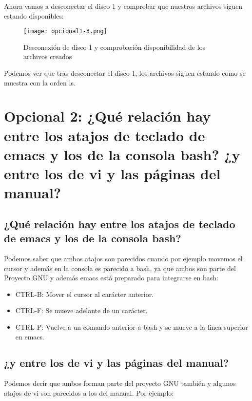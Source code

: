 	Ahora vamos a desconectar el disco 1 y comprobar que nuestros archivos siguen estando disponibles:
	
	\begin{figure}[H]
		\centering
		\texttt{[image: opcional1-3.png]}  
		\label{figura28}
		
		\caption{Desconexión de disco 1 y comprobación disponibilidad de los archivos creados} 
	\end{figure}
	
	Podemos ver que tras desconectar el disco 1, los archivos siguen estando como se muestra con la orden ls.
	\section{Opcional 2: ¿Qué relación hay entre los atajos de teclado de emacs y los de la consola bash? ¿y entre los de vi y las páginas del manual?}
	
	\subsection{¿Qué relación hay entre los atajos de teclado de emacs y los de la consola bash?}
	
	Podemos saber que ambos atajos son parecidos cuando por ejemplo movemos el cursor y además en la consola es parecido a bash, ya que ambos son parte del Proyecto GNU y además emacs está preparado para integrarse en bash\cite{cincuentaynueve,sesenta}:
	
	\begin{itemize}
		\item CTRL-B: Mover el cursor al carácter anterior.
		\item CTRL-F: Se mueve adelante de un carácter.
		\item CTRL-P: Vuelve a un comando anterior a bash y se mueve a la linea superior en emacs.
	\end{itemize}
	
	\subsection{¿y entre los de vi y las páginas del manual?}
	
	Podemos decir que ambos forman parte del proyecto GNU también y algunos atajos de vi\cite{sesentayuno,sesentaydos} son parecidos a los del manual. Por ejemplo:
	
